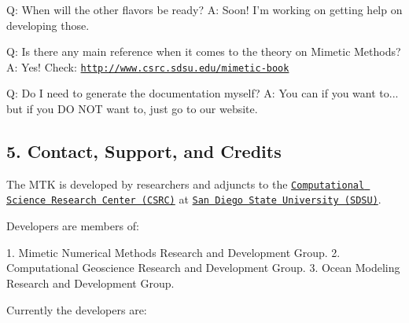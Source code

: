 \begin{DoxyPre}Q: When will the other flavors be ready?
A: Soon! I'm working on getting help on developing those.\end{DoxyPre}



\begin{DoxyPre}Q: Is there any main reference when it comes to the theory on Mimetic Methods?
A: Yes! Check: \href{http://www.csrc.sdsu.edu/mimetic-book}{\tt http://www.csrc.sdsu.edu/mimetic-book}\end{DoxyPre}



\begin{DoxyPre}Q: Do I need to generate the documentation myself?
A: You can if you want to... but if you DO NOT want to, just go to our website.


\end{DoxyPre}



\begin{DoxyPre}\subsection*{5. Contact, Support, and Credits}\end{DoxyPre}



\begin{DoxyPre}\end{DoxyPre}



\begin{DoxyPre}The MTK is developed by researchers and adjuncts to the
\href{http://www.csrc.sdsu.edu/}{\tt Computational Science Research Center (CSRC)}
at \href{http://www.sdsu.edu/}{\tt San Diego State University (SDSU)}.\end{DoxyPre}



\begin{DoxyPre}Developers are members of:\end{DoxyPre}



\begin{DoxyPre}1. Mimetic Numerical Methods Research and Development Group.
2. Computational Geoscience Research and Development Group.
3. Ocean Modeling Research and Development Group.\end{DoxyPre}



\begin{DoxyPre}Currently the developers are:\end{DoxyPre}



